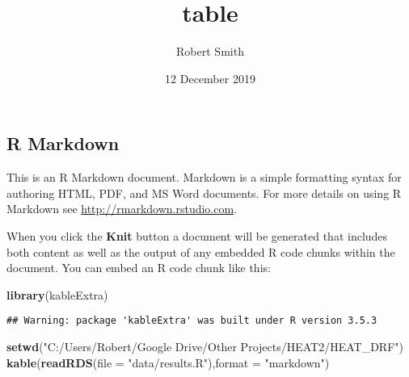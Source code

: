 \documentclass[]{article}
\title{table}
\author{Robert Smith}
\date{12 December 2019}
\newenvironment{Shaded}{\begin{snugshade}}{\end{snugshade}}
\newcommand{\DataTypeTok}[1]{\textcolor[rgb]{0.13,0.29,0.53}{#1}}
\newcommand{\KeywordTok}[1]{\textcolor[rgb]{0.13,0.29,0.53}{\textbf{#1}}}
\newcommand{\NormalTok}[1]{#1}
\newcommand{\StringTok}[1]{\textcolor[rgb]{0.31,0.60,0.02}{#1}}
\begin{document}
\maketitle

\hypertarget{r-markdown}{%
\subsection{R Markdown}\label{r-markdown}}

This is an R Markdown document. Markdown is a simple formatting syntax
for authoring HTML, PDF, and MS Word documents. For more details on
using R Markdown see \url{http://rmarkdown.rstudio.com}.

When you click the \textbf{Knit} button a document will be generated
that includes both content as well as the output of any embedded R code
chunks within the document. You can embed an R code chunk like this:

\begin{Shaded}
\begin{Highlighting}[]
\KeywordTok{library}\NormalTok{(kableExtra)}
\end{Highlighting}
\end{Shaded}

\begin{verbatim}
## Warning: package 'kableExtra' was built under R version 3.5.3
\end{verbatim}

\begin{Shaded}
\begin{Highlighting}[]
\KeywordTok{setwd}\NormalTok{(}\StringTok{"C:/Users/Robert/Google Drive/Other Projects/HEAT2/HEAT_DRF"}\NormalTok{)}
\KeywordTok{kable}\NormalTok{(}\KeywordTok{readRDS}\NormalTok{(}\DataTypeTok{file =} \StringTok{"data/results.R"}\NormalTok{),}\DataTypeTok{format =} \StringTok{"markdown"}\NormalTok{) }
\end{Highlighting}
\end{Shaded}
\end{document}
